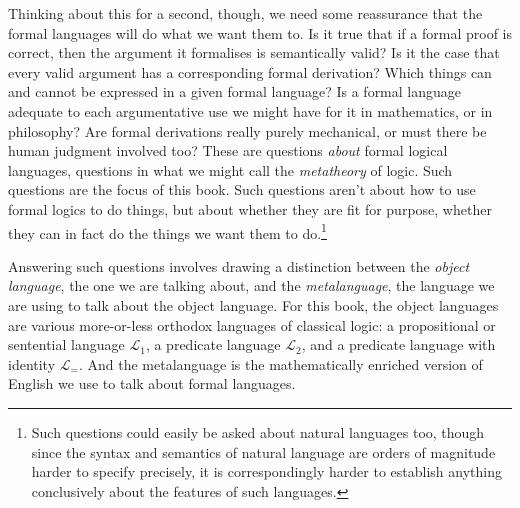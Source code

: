 \documentclass[openany,leqno,11pt,draft]{book}
\theoremstyle{break}
\theoremstyle{definition}
\theoremstyle{remark}
\newcommand{\lone}{\ensuremath{\mathcal{L}_{1}}}
\newcommand{\ltwo}{\ensuremath{\mathcal{L}_{2}}}
\newcommand{\lequ}{\ensuremath{\mathcal{L}_{=}}}
\begin{document}
Thinking about this for a second, though, we need some reassurance that the formal languages will do what we want them to. Is it true that if a formal proof is correct, then the argument it formalises is semantically valid? Is it the case that every valid argument has a corresponding formal derivation? Which things can and cannot be expressed in a given formal language? Is a formal language adequate to each argumentative use we might have for it in mathematics, or in philosophy? Are formal derivations really purely mechanical, or must there be human judgment involved too? These are questions \emph{about} formal logical languages, questions in what we might call the \emph{metatheory} of logic. Such questions are the focus of this book. Such questions aren't about how to use formal logics to do things, but about whether they are fit for purpose, whether they can in fact do the things we want them to do.\footnote{Such questions could easily be asked about natural languages too, though since the syntax and semantics of natural language are orders of magnitude harder to specify precisely, it is correspondingly harder to establish anything conclusively about the features of such languages.}

Answering such questions involves drawing a distinction between the \emph{object language}, the one we are talking about, and the \emph{metalanguage}, the language we are using to talk about the object language. For this book, the object languages are various more-or-less orthodox languages of classical logic: a propositional or sentential language \lone, a predicate language \ltwo, and a predicate language with identity \lequ. And the metalanguage is the mathematically enriched version of English we use to talk about formal languages. 
\end{document}
